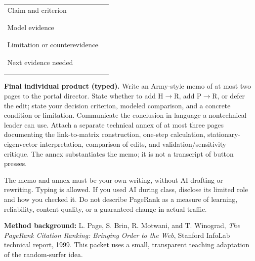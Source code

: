 \documentclass[10pt,letterpaper]{article}
\begin{document}
\begin{tabularx}{\linewidth}{@{}p{2in}Y@{}}
\toprule
Claim and criterion & \rule{0pt}{0.40in}\\
\\
\\
\midrule
Model evidence & \rule{0pt}{0.45in}\\
\\
\\
\midrule
Limitation or counterevidence & \rule{0pt}{0.45in}\\
\\
\\
\midrule
Next evidence needed & \rule{0pt}{0.40in}\\
\\
\\
\bottomrule
\end{tabularx}

\textbf{Final individual product (typed).} Write an Army-style memo of at most two pages to the portal director. State whether to add H$\to$R, add P$\to$R, or defer the edit; state your decision criterion, modeled comparison, and a concrete condition or limitation. Communicate the conclusion in language a nontechnical leader can use. Attach a separate technical annex of at most three pages documenting the link-to-matrix construction, one-step calculation, stationary-eigenvector interpretation, comparison of edits, and validation/sensitivity critique. The annex substantiates the memo; it is not a transcript of button presses.

The memo and annex must be your own writing, without AI drafting or rewriting. Typing is allowed. If you used AI during class, disclose its limited role and how you checked it. Do not describe PageRank as a measure of learning, reliability, content quality, or a guaranteed change in actual traffic.

{\footnotesize\textbf{Method background:} L. Page, S. Brin, R. Motwani, and T. Winograd, \emph{The PageRank Citation Ranking: Bringing Order to the Web}, Stanford InfoLab technical report, 1999. This packet uses a small, transparent teaching adaptation of the random-surfer idea.}
\end{document}

